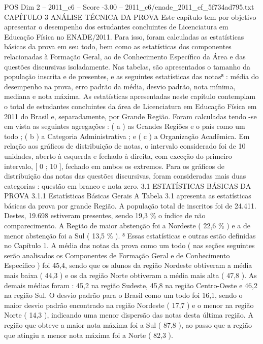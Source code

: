 \begin{textsample}{POS Dim 2 – 2011\_c6 – Score -3.00 – 2011\_c6/enade\_2011\_ef\_5f734ad795.txt}  \label{ex:f2_pos_411}
CAPÍTULO 3 ANÁLISE TÉCNICA DA PROVA Este capítulo tem por objetivo apresentar o desempenho dos estudantes concluintes de Licenciatura em Educação Física no ENADE/2011.
Para isso, foram calculadas as estatísticas básicas da prova em seu todo, bem como as estatísticas dos componentes relacionadas à Formação Geral, ao de Conhecimento Específico da Área e das questões discursivas isoladamente.
Nas tabelas, são apresentados o tamanho da população inscrita e de presentes, e as seguintes estatísticas das notas⁸ : média do desempenho na prova, erro padrão da média, desvio padrão, nota mínima, mediana e nota máxima.
As estatísticas apresentadas neste capítulo contemplam o total de estudantes concluintes da área de Licenciatura em Educação Física em 2011 do Brasil e, separadamente, por Grande Região.
Foram calculadas tendo -se em vista as seguintes agregações : ( a ) as Grandes Regiões e o país como um todo ; ( b ) a Categoria Administrativa ; e ( c ) a Organização Acadêmica.
Em relação aos gráficos de distribuição de notas, o intervalo considerado foi de 10 unidades, aberto à esquerda e fechado à direita, com exceção do primeiro intervalo, [ 0 ; 10 ], fechado em ambos os extremos.
Para os gráficos de distribuição das notas das questões discursivas, foram consideradas mais duas categorias : questão em branco e nota zero. 3.1 ESTATÍSTICAS BÁSICAS DA PROVA 3.1.1 Estatísticas Básicas Gerais A Tabela 3.1 apresenta as estatísticas básicas da prova por grande Região.
A população total de inscritos foi de 24.411.
Destes, 19.698 estiveram presentes, sendo 19,3 \% o índice de não comparecimento.
A Região de maior abstenção foi a Nordeste ( 22,6 \% ) e a de menor abstenção foi a Sul ( 13,5 \% ). ⁸ Essas estatísticas e outras estão definidas no Capítulo 1.
A média das notas da prova como um todo ( nas seções seguintes serão analisados os Componentes de Formação Geral e de Conhecimento Específico ) foi 45,4, sendo que os alunos da região Nordeste obtiveram a média mais baixa ( 44,3 ) e os da região Norte obtiveram a média mais alta ( 47,8 ).
As demais médias foram : 45,2 na região Sudeste, 45,8 na região Centro-Oeste e 46,2 na região Sul.
O desvio padrão para o Brasil como um todo foi 16,1, sendo o maior desvio padrão encontrado na região Nordeste ( 17,7 ) e o menor na região Norte ( 14,3 ), indicando uma menor dispersão das notas desta última região.
A região que obteve a maior nota máxima foi a Sul ( 87,8 ), ao passo que a região que atingiu a menor nota máxima foi a Norte ( 82,3 ).

\end{textsample}
